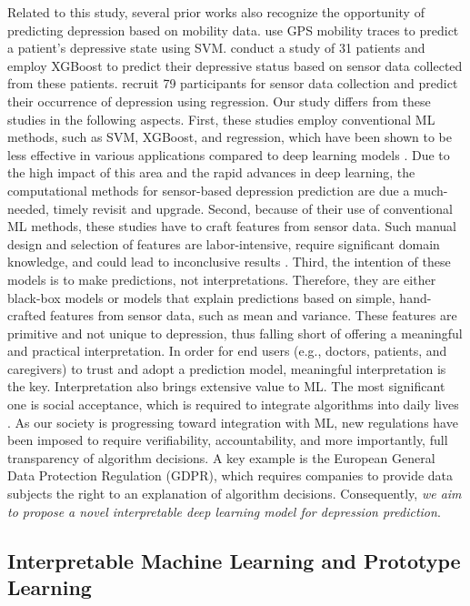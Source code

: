 \documentclass[mnsc]{informs3b} %
\begin{document}
Related to this study, several prior works also recognize the opportunity of predicting depression based on mobility data. \cite{canzian_trajectories_2015} use GPS mobility traces to predict a patient's depressive state using SVM. \cite{jacobson_passive_2020} conduct a study of 31 patients and employ XGBoost to predict their depressive status based on sensor data collected from these patients. \cite{farhan_behavior_2016} recruit 79 participants for sensor data collection and predict their occurrence of depression using regression. Our study differs from these studies in the following aspects. First, these studies employ conventional ML methods, such as SVM, XGBoost, and regression, which have been shown to be less effective in various applications compared to deep learning models \citep{xie_understanding_2022,yu_wearable_2022,zhu_deep_2021}. Due to the high impact of this area and the rapid advances in deep learning, the computational methods for sensor-based depression prediction are due a much-needed, timely revisit and upgrade. Second, because of their use of conventional ML methods, these studies have to craft features from sensor data. Such manual design and selection of features are labor-intensive, require significant domain knowledge, and could lead to inconclusive results \citep{hubble_wearable_2015,yu_wearable_2022}. Third, the intention of these models is to make predictions, not interpretations. Therefore, they are either black-box models or models that explain predictions based on simple, hand-crafted features from sensor data, such as mean and variance. These features are primitive and not unique to depression, thus falling short of offering a meaningful and practical interpretation. In order for end users (e.g., doctors, patients, and caregivers) to trust and adopt a prediction model, meaningful interpretation is the key. Interpretation also brings extensive value to ML. The most significant one is social acceptance, which is required to integrate algorithms into daily lives \citep{xie_unbox_2020}. As our society is progressing toward integration with ML, new regulations have been imposed to require verifiability, accountability, and more importantly, full transparency of algorithm decisions. A key example is the European General Data Protection Regulation (GDPR), which requires companies to provide data subjects the right to an explanation of algorithm decisions. Consequently, \textit{we aim to propose a novel interpretable deep learning model for depression prediction}.

\subsection{Interpretable Machine Learning and Prototype Learning}\label{sec:lr:iml}
\end{document}
